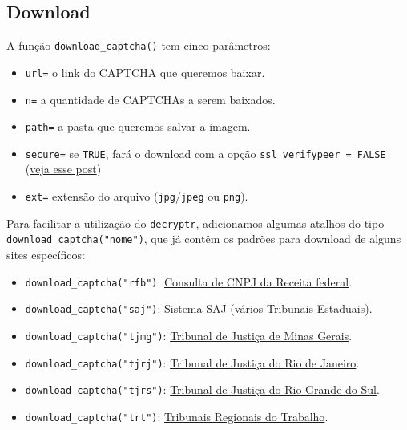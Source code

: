 \documentclass[12pt,]{report}
\providecommand{\tightlist}{%
  \setlength{\itemsep}{0pt}\setlength{\parskip}{0pt}}
\begin{document}
\subsection{Download}\label{download}

A função \texttt{download\_captcha()} tem cinco parâmetros:

\begin{itemize}
\tightlist
\item
  \texttt{url=} o link do CAPTCHA que queremos baixar.
\item
  \texttt{n=} a quantidade de CAPTCHAs a serem baixados.
\item
  \texttt{path=} a pasta que queremos salvar a imagem.
\item
  \texttt{secure=} se \texttt{TRUE}, fará o download com a opção
  \texttt{ssl\_verifypeer\ =\ FALSE}
  (\href{http://curso-r.com/blog/2017/03/31/2017-03-31-ssl/}{veja esse
  post})
\item
  \texttt{ext=} extensão do arquivo (\texttt{jpg}/\texttt{jpeg} ou
  \texttt{png}).
\end{itemize}

Para facilitar a utilização do \texttt{decryptr}, adicionamos algumas
atalhos do tipo \texttt{download\_captcha("nome")}, que já contêm os
padrões para download de alguns sites específicos:

\begin{itemize}
\tightlist
\item
  \texttt{download\_captcha("rfb")}:
  \href{http://www.receita.fazenda.gov.br/pessoajuridica/cnpj/cnpjreva/cnpjreva_solicitacao2.asp}{Consulta
  de CNPJ da Receita federal}.
\item
  \texttt{download\_captcha("saj")}:
  \href{https://esaj.tjsp.jus.br/cjsg/imagemCaptcha.do}{Sistema SAJ
  (vários Tribunais Estaduais)}.
\item
  \texttt{download\_captcha("tjmg")}:
  \href{http://www4.tjmg.jus.br/juridico/sf/captcha.svl}{Tribunal de
  Justiça de Minas Gerais}.
\item
  \texttt{download\_captcha("tjrj")}:
  \href{http://www4.tjrj.jus.br/consultaProcessoWebV2/captcha}{Tribunal
  de Justiça do Rio de Janeiro}.
\item
  \texttt{download\_captcha("tjrs")}:
  \href{http://www.tjrs.jus.br/site_php/consulta/human_check/humancheck_showcode.php}{Tribunal
  de Justiça do Rio Grande do Sul}.
\item
  \texttt{download\_captcha("trt")}:
  \href{https://pje.trt3.jus.br/consultaprocessual/seam/resource/captcha}{Tribunais
  Regionais do Trabalho}.
\end{itemize}
\end{document}
